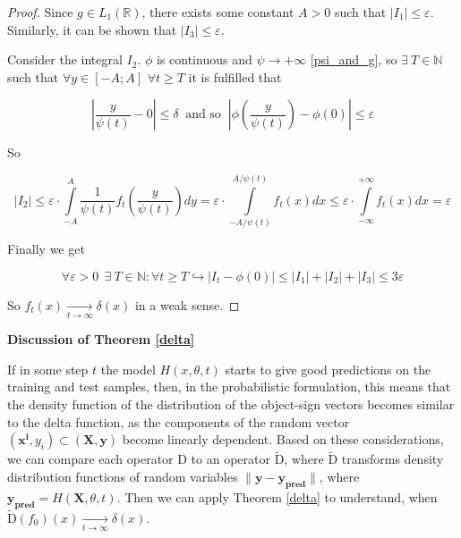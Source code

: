 \documentclass{article}
\begin{document}
\begin{proof}
        Since $g \in L_1(\mathbb{R})$, there exists some constant $A > 0$ such that $\left|I_1\right| \leq \varepsilon$. Similarly, it can be shown that $\left|I_3\right| \leq \varepsilon$.

        Consider the integral $I_2$. $\phi$ is continuous and $\psi \to +\infty$ \eqref{psi_and_g}, so $\exists~ T \in \mathbb{N}$ such that $\forall y \in [-A; A]$ $\forall t \geq T$ it is fulfilled that 

        \begin{equation*}
            \left|\frac{y}{\psi(t)} - 0\right| \leq \delta ~\text{ and so }~ \left|\phi\left(\frac{y}{\psi(t)}\right) - \phi(0)\right| \leq \varepsilon
        \end{equation*}

        So

        \begin{equation*}
            \left|I_2\right| \leq \varepsilon \cdot \int\limits_{-A}^{A} \dfrac{1}{\psi(t)} f_t\left(\frac{y}{\psi(t)}\right) dy = 
            \varepsilon \cdot \int\limits_{-A/\psi(t)}^{A/\psi(t)} f_t\left(x\right) dx \leq \varepsilon \cdot \int\limits_{-\infty}^{+\infty} f_t\left(x\right) dx = \varepsilon
        \end{equation*}

        Finally we get

        \begin{equation*}
            \forall \varepsilon > 0 ~~ \exists~ T \in \mathbb{N} : \forall t \geq T \hookrightarrow \left|I_t - \phi(0)\right| \leq 
            \left|I_1\right| + \left|I_2\right| + \left|I_3\right| \leq 3\varepsilon
        \end{equation*}

        So $f_t(x) \underset{t \to \infty}{\longrightarrow} \delta(x)$ in a weak sense.

    \end{proof}

    \textbf{Discussion of Theorem \ref{delta}}

    If in some step $t$ the model $H(x, \theta, t)$ starts to give good predictions on the training and test samples, then, in the probabilistic formulation, this means that the density function of the distribution of the object-sign vectors becomes similar to the delta function, as the components of the random vector $(\mathbf{x^i}, y_i) \subset (\mathbf{X}, \mathbf{y})$ become linearly dependent. Based on these considerations, we can compare each operator $\text{D}$ to an operator $\widetilde{\text{D}}$, where $\widetilde{\text{D}}$ transforms density distribution functions of random variables $\|\mathbf{y} - \mathbf{y_{\text{pred}}}\|$, where $\mathbf{y_{\text{pred}}} = H(\mathbf{X}, \theta, t)$. Then we can apply Theorem \ref{delta} to understand, when $\widetilde{\text{D}}(f_0)(x) \underset{t \to \infty}{\longrightarrow} \delta(x)$. 
\end{document}

